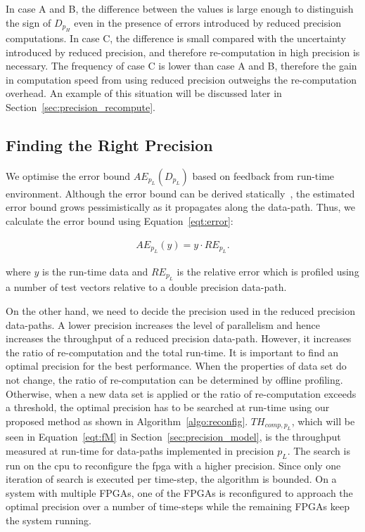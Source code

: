 In case A and B, the difference between the values is large enough to distinguish the sign of $D_{p_H}$ even in the presence of errors introduced by reduced precision computations.
In case C, the difference is small compared with the uncertainty introduced by reduced precision, and therefore re-computation in high precision is necessary.
The frequency of case C is lower than case A and B, therefore the gain in computation speed from using reduced precision outweighs the re-computation overhead.
An example of this situation will be discussed later in Section~\ref{sec:precision_recompute}.

\subsection{Finding the Right Precision}
\label{sec:precision_search}
We optimise the error bound $AE_{p_L}(D_{p_L})$ based on feedback from run-time environment.
Although the error bound can be derived statically~\cite{lee05},
the estimated error bound grows pessimistically as it propagates along the data-path.
Thus, we calculate the error bound using Equation~\ref{eqt:error}:

\begin{equation}
\begin{aligned}
AE_{p_L}(y) = y \cdot RE_{p_L} \mbox{.}
\end{aligned}
\label{eqt:error}
\end{equation}

where $y$ is the run-time data and $RE_{p_L}$ is the relative error which is profiled using a number of test vectors relative to a double precision data-path.

On the other hand, we need to decide the precision used in the reduced precision data-paths.
A lower precision increases the level of parallelism and hence increases the throughput of a reduced precision data-path.
However, it increases the ratio of re-computation and the total run-time.
It is important to find an optimal precision for the best performance.
When the properties of data set do not change, the ratio of re-computation can be determined by offline profiling.
Otherwise, when a new data set is applied or the ratio of re-computation exceeds a threshold, the optimal precision has to be searched at run-time using our proposed method as shown in Algorithm~\ref{algo:reconfig}.
$TH_{comp,p_L}$, which will be seen in Equation~\ref{eqt:fM} in Section~\ref{sec:precision_model}, is the throughput measured at run-time for data-paths implemented in precision $p_L$.
The search is run on the \gls{cpu} to reconfigure the \gls{fpga} with a higher precision.
Since only one iteration of search is executed per time-step, the algorithm is bounded.
On a system with multiple FPGAs, one of the FPGAs is reconfigured to approach the optimal precision over a number of time-steps
while the remaining FPGAs keep the system running.


